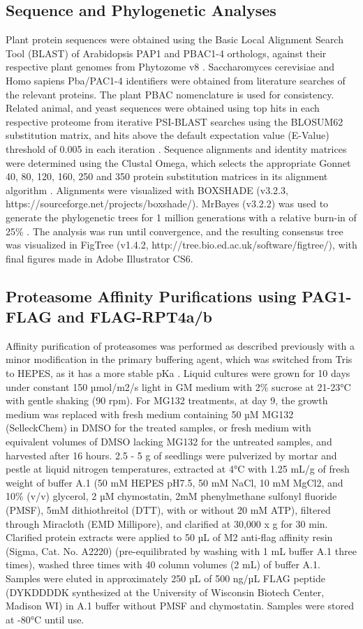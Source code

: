 \subsection{Sequence and Phylogenetic Analyses}
	Plant protein sequences were obtained using the Basic Local Alignment Search Tool (BLAST) of Arabidopsis PAP1 and PBAC1-4 orthologs, against their respective plant genomes from Phytozome v8 . Saccharomyces cerevisiae and Homo sapiens Pba/PAC1-4 identifiers were obtained from literature searches of the relevant proteins. The plant PBAC nomenclature is used for consistency. Related animal, and yeast sequences were obtained using top hits in each respective proteome from iterative PSI-BLAST searches using the BLOSUM62 substitution matrix, and hits above the default expectation value (E-Value) threshold of 0.005 in each iteration \citep{altschul97}. Sequence alignments and identity matrices were determined using the Clustal Omega, which selects the appropriate Gonnet 40, 80, 120, 160, 250 and 350 protein substitution matrices in its alignment algorithm \citep{gonnet92, sievers14, sievers11}. Alignments were visualized with BOXSHADE (v3.2.3, https://sourceforge.net/projects/boxshade/). MrBayes (v3.2.2) was used to generate the phylogenetic trees for 1 million generations with a relative burn-in of 25\% \citep{ronquist12}. The analysis was run until convergence, and the resulting consensus tree was visualized in FigTree (v1.4.2, http://tree.bio.ed.ac.uk/software/figtree/), with final figures made in Adobe Illustrator CS6. 

\subsection{Proteasome Affinity Purifications using PAG1-FLAG and FLAG-RPT4a/b}
	Affinity purification of proteasomes was performed as described previously with a minor modification in the primary buffering agent, which was switched from Tris to HEPES, as it has a more stable pKa \citep{book10}. Liquid cultures were grown for 10 days under constant 150 µmol/m2/s light in GM medium with 2\% sucrose at 21-23°C with gentle shaking (90 rpm). For MG132 treatments, at day 9, the growth medium was replaced with fresh medium containing 50 µM MG132 (SelleckChem) in DMSO for the treated samples, or fresh medium with equivalent volumes of DMSO lacking MG132 for the untreated samples, and harvested after 16 hours. 2.5 - 5 g of seedlings were pulverized by mortar and pestle at liquid nitrogen temperatures, extracted at 4°C with 1.25 mL/g of fresh weight of buffer A.1 (50 mM HEPES pH7.5, 50 mM NaCl, 10 mM MgCl2, and 10\%  (v/v) glycerol, 2 µM chymostatin, 2mM phenylmethane sulfonyl fluoride (PMSF), 5mM dithiothreitol (DTT), with or without 20 mM ATP), filtered through Miracloth (EMD Millipore), and clarified at 30,000 x g for 30 min. Clarified protein extracts were applied to 50 µL of M2 anti-flag affinity resin (Sigma, Cat. No. A2220) (pre-equilibrated by washing with 1 mL buffer A.1 three times), washed three times with 40 column volumes (2 mL) of buffer A.1. Samples were eluted in approximately 250 µL of 500 ng/µL FLAG peptide (DYKDDDDK synthesized at the University of Wisconsin Biotech Center, Madison WI) in A.1 buffer without PMSF and chymostatin. Samples were stored at -80°C until use.
	
